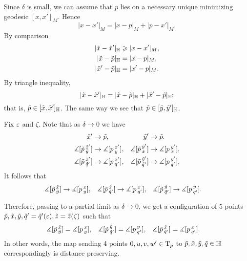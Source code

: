 \hide
\begin{wrapfigure}{r}{35 mm}
\end{wrapfigure}
\unhide

Since $\delta$ is small, we can assume that $p$ lies on a necessary unique minimizing geodesic $[x,x']_M$.
Hence 
\[|x-x'|_M=|x-p|_M+|p-x'|_M.\]
By comparison
\begin{align*}
|\~x-\~x'|_\HH&\ge|x-x'|_M,
\\
|\~x-\~p|_\HH&=|x-p|_M,
\\
|\~x'-\~p|_\HH&=|x'-p|_M.
\end{align*}
By triangle inequality,
\[|\~x-\~x'|_\HH=|\~x-\~p|_\HH+|\~x'-\~p|_\HH;\]
that is, $\~p\in [\~x,\~x']_\HH$.
The same way we see that $\~p\in [\~y,\~y']_\HH$.

Fix $\eps$ and $\zeta$.
Note that as $\delta\to 0$ we have 
\begin{align*}
\~x'&\to \~p,
&
\~y'&\to \~p.
\\
\measuredangle[\~p\,^{\~x'}_{\~y}]&\to \measuredangle[p\,^{x'}_{y}],
&
\measuredangle[\~p\,^{\~y'}_{\~x}]&\to \measuredangle[p\,^{y'}_{x}],
\\
\measuredangle[\~p\,^{\~x'}_{\~q'}]&\to \measuredangle[p\,^{x'}_{q'}],
&
\measuredangle[\~p\,^{\~y'}_{\~q'}]&\to \measuredangle[p\,^{y'}_{q'}],
\end{align*}
It follows that 
\begin{align*}
\measuredangle[\~p\,^{\~x}_{\~y}]&\to \measuredangle[p\,^x_y],
&
\measuredangle[\~p\,^{\~x}_{\~q'}]&\to \measuredangle[p\,^x_{q'}],
&
\measuredangle[\~p\,^{\~y}_{\~q'}]&\to \measuredangle[p\,^y_{q'}].
\end{align*}


Therefore, passing to a partial limit as $\delta\to0$, we get a configuration of 5 points 
$\~p, \~x,\~y,\~q'=\~q'(\eps),\~z=\~z(\zeta)$ such that  
\begin{align*}
\measuredangle[\~p\,^{\~x}_{\~y}]&= \measuredangle[p\,^{x}_{y}],
&
\measuredangle[\~p\,^{\~y}_{\~q'}]&= \measuredangle[p\,^{y}_{q'}],
&
\measuredangle[\~p\,^{\~x}_{\~q'}]&= \measuredangle[p\,^{x}_{q'}].
\end{align*}
In other words, the map sending 4 points $0,u,v,w'\in\T_p$ to $\~p,\~x,\~y,\~q\in\HH$ correspondingly is distance preserving.

